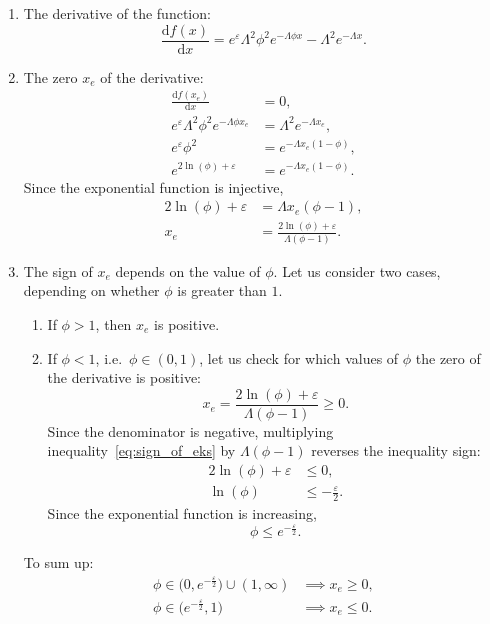 \begin{enumerate}[label=\arabic*.]
\item The derivative of the function:
\[
\frac{\mathrm{d}f(x)}{\mathrm{d}x} = e^{\varepsilon}\Lambda^2\phi^2 e^{-\Lambda\phi x} - \Lambda^{2} e^{-\Lambda x}.
\]

\item The zero $x_e$ of the derivative:
\begin{align*}
\frac{\mathrm{d}f(x_e)}{\mathrm{d}x} &= 0, \\
e^{\varepsilon}\Lambda^2\phi^2 e^{-\Lambda\phi x_e} &= \Lambda^{2} e^{-\Lambda x_e}, \\
e^{\varepsilon}\phi^2 &= e^{-\Lambda x_e (1-\phi)}, \\
e^{2\ln(\phi) + \varepsilon} &= e^{-\Lambda x_e (1-\phi)}.
\end{align*}
Since the exponential function is injective,
\begin{align*}
2\ln(\phi) + \varepsilon &= \Lambda x_e (\phi-1), \\
x_e &= \frac{2\ln(\phi) + \varepsilon}{\Lambda(\phi-1)}.
\end{align*}

\item The sign of $x_e$ depends on the value of $\phi$. Let us consider two cases, depending on whether $\phi$ is greater than $1$.
\begin{enumerate}[label=(\alph*)]
  \item If $\phi > 1$, then $x_e$ is positive.
  \item If $\phi < 1$, i.e.\ $\phi \in (0, 1)$, let us check for which values of $\phi$ the zero of the derivative is positive:
  \begin{equation}
  x_e = \frac{2\ln(\phi) + \varepsilon}{\Lambda(\phi-1)} \geq 0.
  \label{eq:sign_of_eks}
  \end{equation}
  Since the denominator is negative, multiplying inequality~\eqref{eq:sign_of_eks} by $\Lambda(\phi-1)$ reverses the inequality sign:
  \begin{align*}
  2\ln(\phi) + \varepsilon &\leq 0, \\
  \ln(\phi) &\leq -\frac{\varepsilon}{2}.
  \end{align*}
  Since the exponential function is increasing,
  \[
  \phi \leq e^{-\frac{\varepsilon}{2}}.
  \]
\end{enumerate}
To sum up:
\begin{align*}
\phi \in \bigl(0, e^{-\frac{\varepsilon}{2}}\bigr) \cup (1, \infty) &\implies x_e \geq 0, \\
\phi \in \bigl(e^{-\frac{\varepsilon}{2}}, 1\bigr) &\implies x_e \leq 0.
\end{align*}


\end{enumerate}

